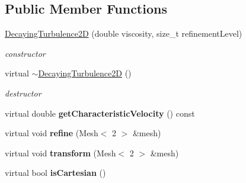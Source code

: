 \subsection*{Public Member Functions}
\begin{DoxyCompactItemize}
\item 
\hyperlink{classnatrium_1_1DecayingTurbulence2D_af1aebee0f89465ec385a1a749f0ceb76}{DecayingTurbulence2D} (double viscosity, size\_\-t refinementLevel)
\begin{DoxyCompactList}\small\item\em constructor \item\end{DoxyCompactList}\item 
\hypertarget{classnatrium_1_1DecayingTurbulence2D_a82284a66335b86b3d82c2dca05ab6a77}{
virtual \hyperlink{classnatrium_1_1DecayingTurbulence2D_a82284a66335b86b3d82c2dca05ab6a77}{$\sim$DecayingTurbulence2D} ()}
\label{classnatrium_1_1DecayingTurbulence2D_a82284a66335b86b3d82c2dca05ab6a77}

\begin{DoxyCompactList}\small\item\em destructor \item\end{DoxyCompactList}\item 
\hypertarget{classnatrium_1_1DecayingTurbulence2D_a55dba4c6ae8523bc144db1bfe3a72951}{
virtual double {\bfseries getCharacteristicVelocity} () const }
\label{classnatrium_1_1DecayingTurbulence2D_a55dba4c6ae8523bc144db1bfe3a72951}

\item 
\hypertarget{classnatrium_1_1DecayingTurbulence2D_a391fe8a9c2ccaf4aaf6fcde4ea9e88f0}{
virtual void {\bfseries refine} (Mesh$<$ 2 $>$ \&mesh)}
\label{classnatrium_1_1DecayingTurbulence2D_a391fe8a9c2ccaf4aaf6fcde4ea9e88f0}

\item 
\hypertarget{classnatrium_1_1DecayingTurbulence2D_a1d5c4e7c4addab6647514ed4e102c181}{
virtual void {\bfseries transform} (Mesh$<$ 2 $>$ \&mesh)}
\label{classnatrium_1_1DecayingTurbulence2D_a1d5c4e7c4addab6647514ed4e102c181}

\item 
\hypertarget{classnatrium_1_1DecayingTurbulence2D_aa61a142ac3553e004dc053094819d816}{
virtual bool {\bfseries isCartesian} ()}
\label{classnatrium_1_1DecayingTurbulence2D_aa61a142ac3553e004dc053094819d816}

\end{DoxyCompactItemize}


